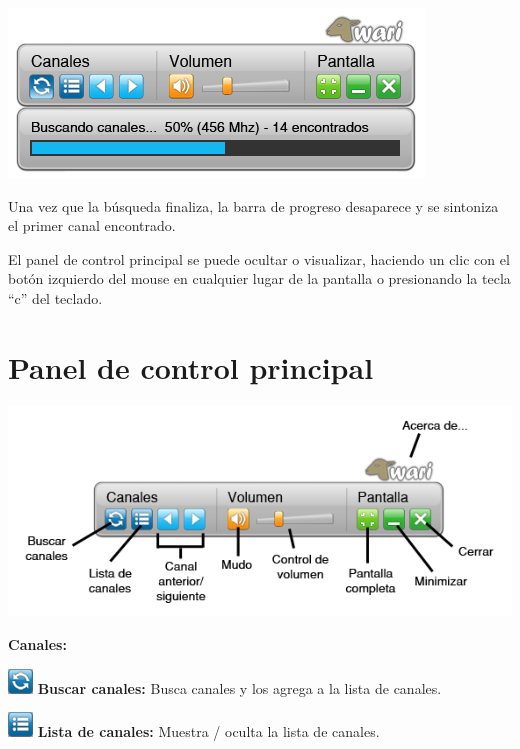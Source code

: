 \documentclass{article}
\begin{document}
\vspace{0.5cm}
\centerline{\includegraphics[scale=0.75,keepaspectratio=true]{Player-Scan}}

Una vez que la búsqueda finaliza, la barra de progreso desaparece y se sintoniza el primer canal encontrado.

El panel de control principal se puede ocultar o visualizar, haciendo un clic con el botón izquierdo del mouse en cualquier lugar de la pantalla o presionando la tecla ``c'' del teclado.

\vspace{0.5cm}
\section{Panel de control principal}

\centerline{\includegraphics[scale=0.75,keepaspectratio=true]{Player-Referencias}}

\vspace{0.5cm}

\textbf{Canales:}
\vspace{0.5cm}

\includegraphics[scale=0.75,keepaspectratio=true]{BtnCanalesScan} \textbf{Buscar canales:} Busca canales y los agrega a la lista de canales.

\includegraphics[scale=0.75,keepaspectratio=true]{BtnCanalesLista} \textbf{Lista de canales:} Muestra / oculta la lista de canales.
\end{document}
